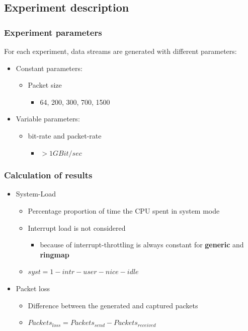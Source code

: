 \documentclass{beamer}
\begin{document}
\subsection*{Experiment description}


\begin{frame}
\frametitle{Experiment parameters}
For each experiment, data streams are generated with different parameters:
\begin{itemize}
	\item Constant parameters: 
		\begin{itemize}
			\item Packet size
				\begin{itemize}
					\item 64, 200, 300, 700, 1500
				\end{itemize}
		\end{itemize}
	\item Variable parameters: 
		\begin{itemize}
			\item bit-rate and packet-rate
				\begin{itemize}
					\item  $ > 1GBit/sec$
				\end{itemize}
		\end{itemize}
\end{itemize}

\end{frame}

\begin{frame}
\frametitle{Calculation of results}
\begin{itemize}
	\item System-Load
		\begin{itemize}
			\item Percentage proportion of time the CPU spent in system mode
			\item Interrupt load is not considered
				\begin{itemize}
					\item because of interrupt-throttling is always constant for \textbf{generic} and \textbf{ringmap}
				\end{itemize}
			\item $syst = 1 - intr - user - nice - idle$\newline
		\end{itemize}
	\item Packet loss
		\begin{itemize}
			\item Difference between the generated and captured packets
			\item $Packets_{loss} = Packets_{send} - Packets_{received}$
		\end{itemize}
\end{itemize}
\end{frame}
\end{document}
